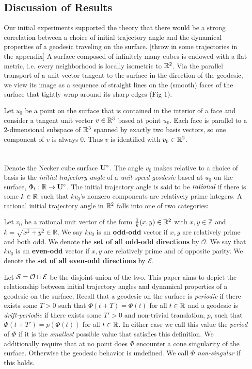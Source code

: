 \documentclass[]{article}
\begin{document}
\subsection{Discussion of Results}
Our initial experiments supported the theory that there would be a strong correlation between a choice of initial trajectory angle and the dynamical properties of a geodesic traveling on the surface. [throw in some trajectories in the appendix] A surface composed of infinitely many cubes is endowed with a flat metric, i.e. every neighborhood is locally isometric to $\mathbb{R}^2$. Via the parallel transport of a unit vector tangent to the surface in the direction of the geodesic, we view its image as a sequence of straight lines on the (smooth) faces of the surface that tightly wrap around its sharp edges (Fig 1).
\\
\begin{figure}

\end{figure}
\noindent Let $u_0$ be a point on the surface that is contained in the interior of a face and consider a tangent unit vector $v\in\mathbb{R}^3$ based at point $u_0$. Each face is parallel to a $2$-dimensional subspace of $\mathbb{R}^3$ spanned by exactly two basis vectors, so one component of $v$ is always 0. Thus $v$ is identified with $v_0\in\mathbb{R}^2$.
\\\\\\
Denote the Necker cube surface $\mathbf{U}^\circ$. The angle $v_0$ makes relative to a choice of basis is the \emph{initial trajectory angle} of a \emph{unit-speed geodesic} based at $u_0$ on the surface, $\Phi_t:\mathbb{R}\rightarrow\mathbf{U}^\circ$. The initial trajectory angle is said to be $\emph{rational}$ if there is some $k\in\mathbb{R}$ such that $kv_0$'s nonzero components are relatively prime integers. A rational initial trajectory angle in $\mathbb{R}^2$ falls into one of two categories:
\begin{Def}
Let $v_0$ be a rational unit vector of the form $\frac{1}{k}(x,y)\in\mathbb{R}^2$ with $x,y\in\mathbb{Z}$ and $k=\sqrt{x^2+y^2}\in\mathbb{R}$. We say $kv_0$ is an \textbf{odd-odd} vector if $x,y$ are relatively prime and both odd. We denote the \textbf{set of all odd-odd directions} by $\mathcal{O}$. We say that $kv_0$ is an \textbf{even-odd} vector if $x,y$ are relatively prime and of opposite parity. We denote the \textbf{set of all even-odd directions} by $\mathcal{E}$.
\end{Def}
\noindent Let $\mathcal{S}=\mathcal{O}\sqcup\mathcal{E}$ be the disjoint union of the two. This paper aims to depict the relationship between initial trajectory angles and dynamical properties of a geodesic on the surface. Recall that a geodesic on the surface is \emph{periodic} if there exists some $T>0$ such that $\Phi(t+T)=\Phi(t)$ for all $t\in\mathbb{R}$ and a geodesic is \emph{drift-periodic} if there exists some $T'>0$ and non-trivial translation, $p$, such that $\Phi(t+T')=p(\Phi(t))$ for all $t\in\mathbb{R}$. In either case we call this value the \emph{period} of $\Phi$ if it is the \emph{smallest} possible value that satisfies this definition. We additionally require that at no point does $\Phi$ encounter a cone singularity of the surface. Otherwise the geodesic behavior is undefined. We call $\Phi$ \emph{non-singular} if this holds. 
\end{document}
